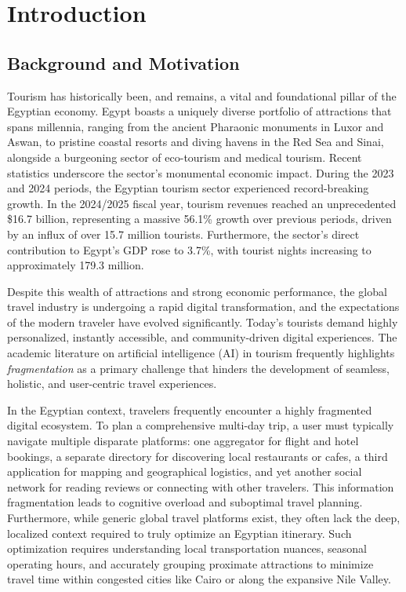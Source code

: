 \chapter{Introduction}

\section{Background and Motivation}
Tourism has historically been, and remains, a vital and foundational pillar of the Egyptian economy. Egypt boasts a uniquely diverse portfolio of attractions that spans millennia, ranging from the ancient Pharaonic monuments in Luxor and Aswan, to pristine coastal resorts and diving havens in the Red Sea and Sinai, alongside a burgeoning sector of eco-tourism and medical tourism. Recent statistics underscore the sector's monumental economic impact. During the 2023 and 2024 periods, the Egyptian tourism sector experienced record-breaking growth. In the 2024/2025 fiscal year, tourism revenues reached an unprecedented \$16.7 billion, representing a massive 56.1\% growth over previous periods, driven by an influx of over 15.7 million tourists. Furthermore, the sector's direct contribution to Egypt's GDP rose to 3.7\%, with tourist nights increasing to approximately 179.3 million. 

Despite this wealth of attractions and strong economic performance, the global travel industry is undergoing a rapid digital transformation, and the expectations of the modern traveler have evolved significantly. Today's tourists demand highly personalized, instantly accessible, and community-driven digital experiences. The academic literature on artificial intelligence (AI) in tourism frequently highlights \textit{fragmentation} as a primary challenge that hinders the development of seamless, holistic, and user-centric travel experiences. 

In the Egyptian context, travelers frequently encounter a highly fragmented digital ecosystem. To plan a comprehensive multi-day trip, a user must typically navigate multiple disparate platforms: one aggregator for flight and hotel bookings, a separate directory for discovering local restaurants or cafes, a third application for mapping and geographical logistics, and yet another social network for reading reviews or connecting with other travelers. This information fragmentation leads to cognitive overload and suboptimal travel planning. Furthermore, while generic global travel platforms exist, they often lack the deep, localized context required to truly optimize an Egyptian itinerary. Such optimization requires understanding local transportation nuances, seasonal operating hours, and accurately grouping proximate attractions to minimize travel time within congested cities like Cairo or along the expansive Nile Valley.

